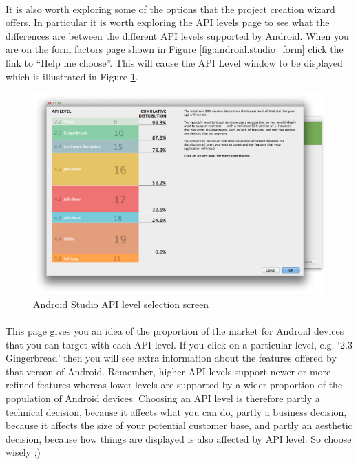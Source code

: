 \documentclass[12pt, a4paper, twoside]{book}
\begin{document}
\paragraph{} It is also worth exploring some of the options that the project creation wizard offers. In particular it is worth exploring the API levels page to see what the differences are between the different API levels supported by Android. When you are on the form factors page shown in Figure \ref{fig:android.studio_form} click the link to ``Help me choose''. This will cause the API Level window to be displayed which is illustrated in Figure \ref{fig:android.studio_apilevel}.

\begin{figure}[H]
\centering
\includegraphics[width=\textwidth]{images/android-studio_04_api-level}
\caption{Android Studio API level selection screen}
\label{fig:android.studio_apilevel}
\end{figure}


\paragraph{} This page gives you an idea of the proportion of the market for Android devices that you can target with each API level. If you click on a particular level, e.g. `2.3 Gingerbread' then you will see extra information about the features offered by that verson of Android. Remember, higher API levels support newer or more refined features whereas lower levels are supported by a wider proportion of the population of Android devices. Choosing an API level is therefore partly a technical decision, because it affects what you can do, partly a business decision, because it affects the size of your potential customer base, and partly an aesthetic decision, because how things are displayed is also affected by API level. So choose wisely ;) 
\end{document}
